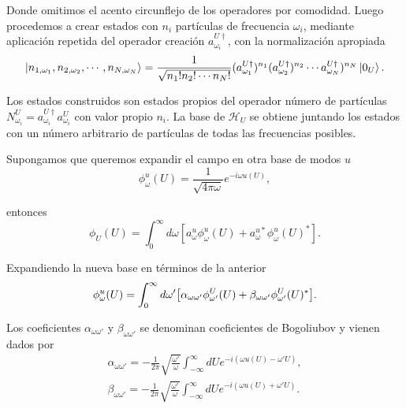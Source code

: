 Donde omitimos el acento circunflejo de los operadores por comodidad.
Luego procedemos a crear estados con $n_i$ partículas de frecuencia $\omega_i$, mediante
aplicación repetida del operador creación $a_{\omega_i}^{U\dagger}$, con la normalización apropiada
\begin{equation}
  \ket{n_{1,\omega_1}, n_{2,\omega_2},\cdots,n_{N,\omega_N}} = \frac{1}{\sqrt{n_1!n_2!\cdots n_N!}}(a_{\omega_1}^{U\dagger})^{n_1}
  (a_{\omega_2}^{U\dagger})^{n_2}\cdots a_{\omega_N}^{U\dagger})^{n_N} \ket{0_U}.
\end{equation}

Los estados construidos son estados propios del operador número de partículas $N_{\omega_i}^U=a_{\omega_i}^{U\dagger}a_{\omega_i}^U$
con valor propio $n_i$.
La base de $\mathcal H_U$ se obtiene juntando los estados con un número arbitrario de partículas
de todas las frecuencias posibles.

Supongamos que queremos expandir el campo en otra base de modos $u$
\begin{equation}
  \phi_\omega^u(U)=\frac{1}{\sqrt{4\pi\omega}}e^{-i\omega u(U)}, 
\end{equation}

entonces
\begin{equation}
  \phi_U(U) = \int_0^\infty d\omega [a_\omega^u \phi^u_\omega(U) +  a_\omega^{u*} \phi_\omega^u(U)^*].
\end{equation}

Expandiendo la nueva base en términos de la anterior
\begin{equation}
  \phi_\omega^u(U) = \int_0^\infty d\omega'\qty[ \alpha_{\omega\omega'} \phi_{\omega'}^U(U) 
  +\beta_{\omega\omega'} \phi_{\omega'}^U(U)^*].
\end{equation}

Los coeficientes $\alpha_{\omega\omega'}$ y $\beta_{\omega\omega'}$ se denominan coeficientes
de Bogoliubov y vienen dados por
\begin{gather}
  \alpha_{\omega\omega'} = -\frac{1}{2\pi}\sqrt{\frac{\omega'}{\omega}}\int_{-\infty}^\infty dU e^{-i(\omega u(U) -\omega' U)},\\
  \beta_{\omega\omega'} = -\frac{1}{2\pi}\sqrt{\frac{\omega'}{\omega}}\int_{-\infty}^\infty dU e^{-i(\omega u(U) +\omega' U)}.
\end{gather}

